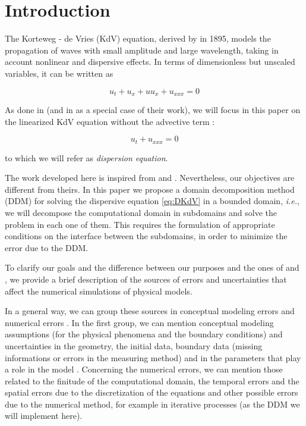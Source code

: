 \section{Introduction}

\indent The Korteweg - de Vries (KdV) equation, derived by \cite{kdv1895} in 1895, models the propagation of waves with small amplitude and large wavelength, taking in account nonlinear and dispersive effects. In terms of dimensionless but unscaled variables, it can be written as \cite{BBM1971}

\begin{equation}
	u_t + u_x + uu_x + u_{xxx} = 0
\end{equation}

\indent As done in \cite{zheng2008} (and in \cite{besse2015} as a special case of their work), we will focus in this paper on the linearized KdV equation without the advective term : 

\begin{equation}
 \label{eq:DKdV}
	u_t  + u_{xxx} = 0
\end{equation}

\noindent to which we will refer as \emph{dispersion equation}.

\indent The work developed here is inspired from \cite{zheng2008} and \cite{besse2015}. Nevertheless, our objectives are different from theirs. In this paper we propose a domain decomposition method (DDM) for solving the dispersive equation \eqref{eq:DKdV} in a bounded domain, \emph{i.e.}, we will decompose the computational domain in subdomains and solve the problem in each one of them. This requires the formulation of appropriate conditions on the interface between the subdomains, in order to minimize the error due to the DDM.

\indent To clarify our goals and the difference between our purposes and the ones of \cite{zheng2008} and \cite{besse2015}, we provide a brief description of the sources of errors and uncertainties that affect the numerical simulations of physical models.

\indent In a general way, we can group these sources in conceptual modeling errors and numerical errors \cite{roache1997}. In the first group, we can mention conceptual modeling assumptions (for the physical phenomena and the boundary conditions) and uncertainties in the geometry, the initial data, boundary data (missing informations or errors in the measuring method) and in the parameters that play a role in the model \cite{roache1997,balagurusamy2008}. Concerning the numerical errors, we can mention those related to the finitude of the computational domain, the temporal errors and the spatial errors due to the discretization of the equations  \cite{karniadakis1995,roache1997} and other possible errors due to the numerical method, for example in iterative processes (as the DDM we will implement here).

